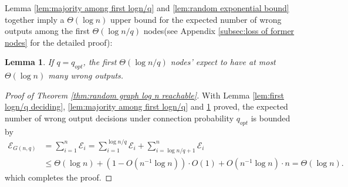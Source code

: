 \documentclass[a4paper,UKenglish]{lipics}
\newtheorem{lem}[thm]{Lemma}
\theoremstyle{definition}
\begin{document}
 Lemma \ref{lem:majority among first logn/q} and \ref{lem:random exponential bound} together imply a $\Theta(\log n)$ upper bound for the expected number of wrong outputs among the first $\Theta(\log n / q)$ nodes(see Appendix \ref{subsec:loss of former nodes} for the detailed proof):
\begin{lem}
\label{lem:loss of former nodes}
If $q = q_{opt}$, the first $\Theta(\log n/q)$ nodes' expect to have at most $\Theta(\log n)$ many wrong outputs.
\end{lem}

\begin{proof}[Proof of Theorem \ref{thm:random graph log n reachable}]
With Lemma \ref{lem:first logn/q deciding}, \ref{lem:majority among first logn/q} and \ref{lem:loss of former nodes} proved, the expected number of wrong output decisions under connection probability $q_{opt}$ is bounded by
\begin{equation}
\begin{aligned}
\label{equ:bound2}
	\mathcal{E}_{G(n,q)}
& =
	\sum_{i=1}^{n}	\mathcal{E}_i
	=
	\sum_{i=1}^{\log n/q}	\mathcal{E}_i + \sum_{i=\log n/q + 1}^{n}	\mathcal{E}_i
\\
& \le
	\Theta(\log n) + (1 - O(n^{-1}\log n))\cdot O(1) + O(n^{-1}\log n)\cdot n
	=
	\Theta(\log n).
\end{aligned}
\end{equation}
which completes the proof.
\end{proof}
\end{document}
